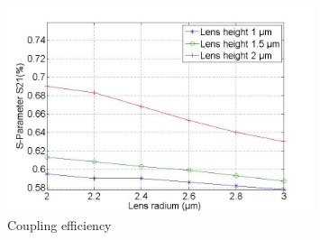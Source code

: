 \begin{figure}[!ht]
\includegraphics[width=0.8\textwidth]{bilder/s21_fix_lens_height_rxx}
\caption{Coupling efficiency }
\label{fig:coupling_lenses_curve_rxx}
\end{figure}

